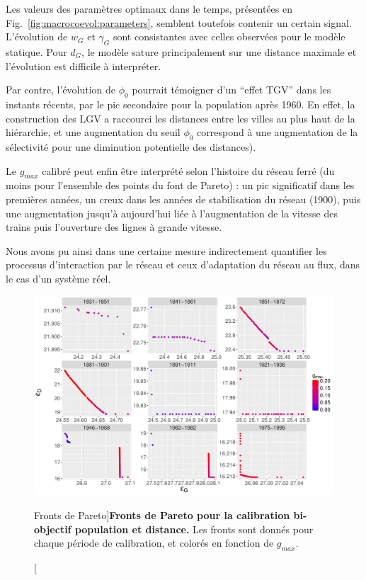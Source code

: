 Les valeurs des paramètres optimaux dans le temps, présentées en Fig.~\ref{fig:macrocoevol:parameters}, semblent toutefois contenir un certain signal. L'évolution de $w_G$ et $\gamma_G$ sont consistantes avec celles observées pour le modèle statique. Pour $d_G$, le modèle sature principalement sur une distance maximale et l'évolution est difficile à interpréter. 

Par contre, l'évolution de $\phi_0$ pourrait témoigner d'un ``effet TGV'' dans les instants récents, par le pic secondaire pour la population après 1960. En effet, la construction des LGV a raccourci les distances entre les villes au plus haut de la hiérarchie, et une augmentation du seuil $\phi_0$ correspond à une augmentation de la sélectivité pour une diminution potentielle des distances).

Le $g_{max}$ calibré peut enfin être interprété selon l'histoire du réseau ferré (du moins pour l'ensemble des points du font de Pareto) : un pic significatif dans les premières années, un creux dans les années de stabilisation du réseau (1900), puis une augmentation jusqu'à aujourd'hui liée à l'augmentation de la vitesse des trains puis l'ouverture des lignes à grande vitesse.

Nous avons pu ainsi dans une certaine mesure indirectement quantifier les processus d'interaction par le réseau et ceux d'adaptation du réseau au flux, dans le cas d'un système réel.

\begin{figure}
	\includegraphics[width=\linewidth]{Figures/Final/6-2-3-fig-macrocoevol-pareto.jpg}
	\caption[Pareto fronts][Fronts de Pareto]{\label{fig:macrocoevol:pareto}}{\textbf{Fronts de Pareto pour la calibration bi-objectif population et distance.} Les fronts sont donnés pour chaque période de calibration, et colorés en fonction de $g_{max}$.\label{fig:macrocoevol:pareto}}
\end{figure}



